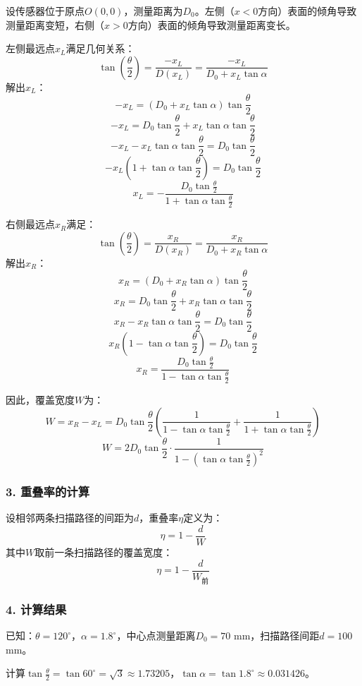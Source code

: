 \documentclass{article}
\begin{document}
	设传感器位于原点\(O(0,0)\)，测量距离为\(D_0\)。左侧（\(x<0\)方向）表面的倾角导致测量距离变短，右侧（\(x>0\)方向）表面的倾角导致测量距离变长。
	
	左侧最远点\(x_L\)满足几何关系：
	\[
	\tan\left(\frac{\theta}{2}\right) = \frac{-x_L}{D(x_L)} = \frac{-x_L}{D_0 + x_L \tan \alpha}
	\]
	解出\(x_L\)：
	\[
	-x_L = (D_0 + x_L \tan \alpha) \tan\frac{\theta}{2}
	\]
	\[
	-x_L = D_0 \tan\frac{\theta}{2} + x_L \tan \alpha \tan\frac{\theta}{2}
	\]
	\[
	-x_L - x_L \tan \alpha \tan\frac{\theta}{2} = D_0 \tan\frac{\theta}{2}
	\]
	\[
	-x_L \left(1 + \tan \alpha \tan\frac{\theta}{2}\right) = D_0 \tan\frac{\theta}{2}
	\]
	\[
	x_L = -\frac{D_0 \tan\frac{\theta}{2}}{1 + \tan \alpha \tan\frac{\theta}{2}}
	\]
	
	右侧最远点\(x_R\)满足：
	\[
	\tan\left(\frac{\theta}{2}\right) = \frac{x_R}{D(x_R)} = \frac{x_R}{D_0 + x_R \tan \alpha}
	\]
	解出\(x_R\)：
	\[
	x_R = (D_0 + x_R \tan \alpha) \tan\frac{\theta}{2}
	\]
	\[
	x_R = D_0 \tan\frac{\theta}{2} + x_R \tan \alpha \tan\frac{\theta}{2}
	\]
	\[
	x_R - x_R \tan \alpha \tan\frac{\theta}{2} = D_0 \tan\frac{\theta}{2}
	\]
	\[
	x_R \left(1 - \tan \alpha \tan\frac{\theta}{2}\right) = D_0 \tan\frac{\theta}{2}
	\]
	\[
	x_R = \frac{D_0 \tan\frac{\theta}{2}}{1 - \tan \alpha \tan\frac{\theta}{2}}
	\]
	
	因此，覆盖宽度\(W\)为：
	\[
	W = x_R - x_L = D_0 \tan\frac{\theta}{2} \left( \frac{1}{1 - \tan \alpha \tan\frac{\theta}{2}} + \frac{1}{1 + \tan \alpha \tan\frac{\theta}{2}} \right)
	\]
	\[
	W = 2D_0 \tan\frac{\theta}{2} \cdot \frac{1}{1 - \left( \tan \alpha \tan\frac{\theta}{2} \right)^2}
	\]
	
	\subsubsection*{3. 重叠率的计算}
	
	设相邻两条扫描路径的间距为\(d\)，重叠率\(\eta\)定义为：
	\[
	\eta = 1 - \frac{d}{W}
	\]
	其中\(W\)取前一条扫描路径的覆盖宽度：
	\[
	\eta = 1 - \frac{d}{W_{\text{前}}}
	\]
	
	\subsubsection*{4. 计算结果}
	
	已知：\(\theta = 120^\circ\)，\(\alpha = 1.8^\circ\)，中心点测量距离\(D_0 = 70\) mm，扫描路径间距\(d = 100\) mm。
	
	计算\(\tan\frac{\theta}{2} = \tan 60^\circ = \sqrt{3} \approx 1.73205\)，\(\tan \alpha = \tan 1.8^\circ \approx 0.031426\)。
	
\end{document}
